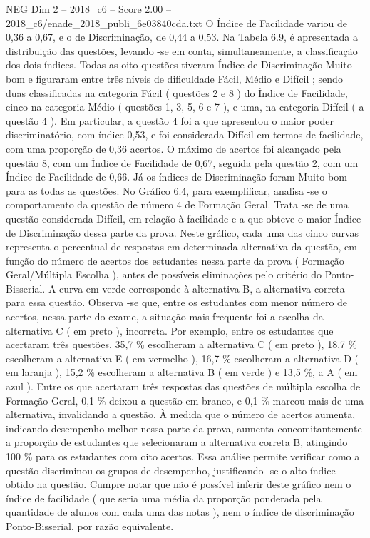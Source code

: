 \begin{textsample}{NEG Dim 2 – 2018\_c6 – Score 2.00 – 2018\_c6/enade\_2018\_publi\_6e03840cda.txt}
O Índice de Facilidade variou de 0,36 a 0,67, e o de Discriminação, de 0,44 a 0,53.
Na Tabela 6.9, é apresentada a distribuição das questões, levando -se em conta, simultaneamente, a classificação dos dois índices.
Todas as oito questões tiveram Índice de Discriminação Muito bom e figuraram entre três níveis de dificuldade Fácil, Médio e Difícil ; sendo duas classificadas na categoria Fácil ( questões 2 e 8 ) do Índice de Facilidade, cinco na categoria Médio ( questões 1, 3, 5, 6 e 7 ), e uma, na categoria Difícil ( a questão 4 ).
Em particular, a questão 4 foi a que apresentou o maior poder discriminatório, com índice 0,53, e foi considerada Difícil em termos de facilidade, com uma proporção de 0,36 acertos.
O máximo de acertos foi alcançado pela questão 8, com um Índice de Facilidade de 0,67, seguida pela questão 2, com um Índice de Facilidade de 0,66.
Já os índices de Discriminação foram Muito bom para as todas as questões.
No Gráfico 6.4, para exemplificar, analisa -se o comportamento da questão de número 4 de Formação Geral.
Trata -se de uma questão considerada Difícil, em relação à facilidade e a que obteve o maior Índice de Discriminação dessa parte da prova.
Neste gráfico, cada uma das cinco curvas representa o percentual de respostas em determinada alternativa da questão, em função do número de acertos dos estudantes nessa parte da prova ( Formação Geral/Múltipla Escolha ), antes de possíveis eliminações pelo critério do Ponto-Bisserial.
A curva em verde corresponde à alternativa B, a alternativa correta para essa questão.
Observa -se que, entre os estudantes com menor número de acertos, nessa parte do exame, a situação mais frequente foi a escolha da alternativa C ( em preto ), incorreta.
Por exemplo, entre os estudantes que acertaram três questões, 35,7 \% escolheram a alternativa C ( em preto ), 18,7 \% escolheram a alternativa E ( em vermelho ), 16,7 \% escolheram a alternativa D ( em laranja ), 15,2 \% escolheram a alternativa B ( em verde ) e 13,5 \%, a A ( em azul ).
Entre os que acertaram três respostas das questões de múltipla escolha de Formação Geral, 0,1 \% deixou a questão em branco, e 0,1 \% marcou mais de uma alternativa, invalidando a questão.
À medida que o número de acertos aumenta, indicando desempenho melhor nessa parte da prova, aumenta concomitantemente a proporção de estudantes que selecionaram a alternativa correta B, atingindo 100 \% para os estudantes com oito acertos.
Essa análise permite verificar como a questão discriminou os grupos de desempenho, justificando -se o alto índice obtido na questão.
Cumpre notar que não é possível inferir deste gráfico nem o índice de facilidade ( que seria uma média da proporção ponderada pela quantidade de alunos com cada uma das notas ), nem o índice de discriminação Ponto-Bisserial, por razão equivalente.

\end{textsample}
